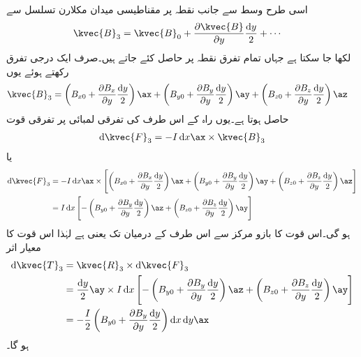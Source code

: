 اسی طرح وسط سے  جانب نقطہ  پر مقناطیسی میدان مکلارن تسلسل سے
\begin{align*}
\kvec{B}_3&=\kvec{B}_0 +\frac{\partial \kvec{B}}{\partial y}\frac{\dif y}{2}+\cdots
\end{align*}
لکھا جا سکتا ہے جہاں تمام تفرق نقطہ  پر حاصل کئے جاتے ہیں۔صرف ایک درجی تفرق رکھتے ہوئے یوں
\begin{align*}
\kvec{B}_3&=\left(B_{x0}+\frac{\partial B_{x}}{\partial y} \frac{\dif y}{2}\right)\ax+\left(B_{y0}+\frac{\partial B_{y}}{\partial y} \frac{\dif y}{2}\right)\ay+\left(B_{z0}+\frac{\partial B_{z}}{\partial y} \frac{\dif y}{2}\right)\az
\end{align*}
حاصل ہوتا ہے۔یوں راہ کے اس طرف کی  تفرقی لمبائی پر تفرقی قوت
\begin{align*}
\dif \kvec{F}_3=-I \dif x \ax \times \kvec{B}_3
\end{align*}
یا
\begin{align*}
\dif \kvec{F}_3&=-I \dif x \ax \times \left[\left(B_{x0}+\frac{\partial B_{x}}{\partial y} \frac{\dif y}{2}\right)\ax+\left(B_{y0}+\frac{\partial B_{y}}{\partial y} \frac{\dif y}{2}\right)\ay+\left(B_{z0}+\frac{\partial B_{z}}{\partial y} \frac{\dif y}{2}\right)\az\right]\\
&=I \dif x \left[-\left(B_{y0}+\frac{\partial B_{y}}{\partial y} \frac{\dif y}{2}\right)\az+\left(B_{z0}+\frac{\partial B_{z}}{\partial y} \frac{\dif y}{2}\right)\ay \right]
\end{align*}
ہو گی۔اس قوت کا بازو مرکز سے اس طرف کے درمیان تک  یعنی  ہے لہٰذا اس قوت کا معیار اثر
\begin{align*}
\dif \kvec{T}_3&=\kvec{R}_3 \times \dif \kvec{F}_3\\
&=\frac{\dif y}{2}\ay \times I \dif x \left[-\left(B_{y0}+\frac{\partial B_{y}}{\partial y} \frac{\dif y}{2}\right)\az+\left(B_{z0}+\frac{\partial B_{z}}{\partial y} \frac{\dif y}{2}\right)\ay \right]\\
&=-\frac{I}{2}\left(B_{y0}+\frac{\partial B_{y}}{\partial y} \frac{\dif y}{2}\right)\dif x \dif y\ax
\end{align*}
ہو گا۔ 

